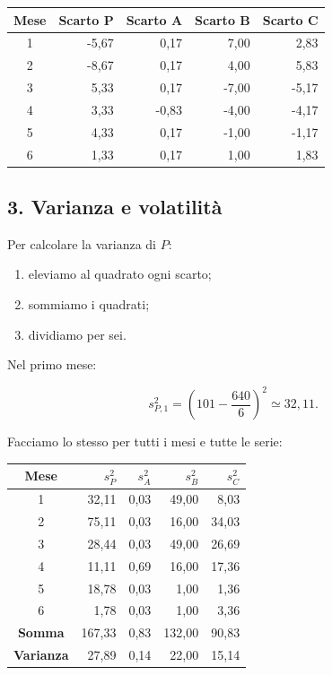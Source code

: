 \begin{center}
    \begin{tabular}{|c|r|r|r|r|}
        \hline
        \textbf{Mese}
        & \textbf{Scarto P}
        & \textbf{Scarto A}
        & \textbf{Scarto B}
        & \textbf{Scarto C} \\
        \hline
        1 & -5,67 & 0,17 & 7,00 & 2,83 \\
        2 & -8,67 & 0,17 & 4,00 & 5,83 \\
        3 & 5,33 & 0,17 & -7,00 & -5,17 \\
        4 & 3,33 & -0,83 & -4,00 & -4,17 \\
        5 & 4,33 & 0,17 & -1,00 & -1,17 \\
        6 & 1,33 & 0,17 & 1,00 & 1,83 \\
        \hline
    \end{tabular}
\end{center}


\subsection*{3. Varianza e volatilità}

\noindent Per calcolare la varianza di $P$:

\begin{enumerate}
    \item eleviamo al quadrato ogni scarto;
    \item sommiamo i quadrati;
    \item dividiamo per sei.
\end{enumerate}

\noindent Nel primo mese:

\[
s_{P,1}^2
=
\left(101-\frac{640}{6}\right)^2
\simeq32{,}11.
\]

\noindent Facciamo lo stesso
per tutti i mesi e tutte le serie:

\begin{center}
    \begin{tabular}{|c|r|r|r|r|}
        \hline
        \textbf{Mese}
        & $s_P^2$ & $s_A^2$ & $s_B^2$ & $s_C^2$ \\
        \hline
        1 & 32,11 & 0,03 & 49,00 & 8,03 \\
        2 & 75,11 & 0,03 & 16,00 & 34,03 \\
        3 & 28,44 & 0,03 & 49,00 & 26,69 \\
        4 & 11,11 & 0,69 & 16,00 & 17,36 \\
        5 & 18,78 & 0,03 & 1,00 & 1,36 \\
        6 & 1,78 & 0,03 & 1,00 & 3,36 \\
        \hline
        \textbf{Somma} & 167,33 & 0,83 & 132,00 & 90,83 \\
        \hline
        \textbf{Varianza} & 27,89 & 0,14 & 22,00 & 15,14 \\
        \hline
    \end{tabular}
\end{center}

